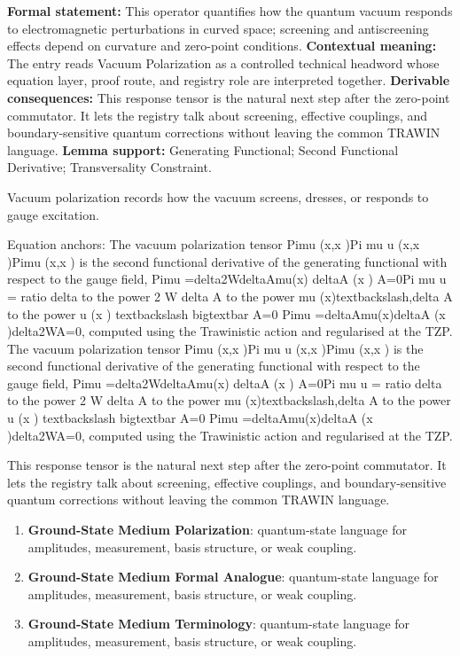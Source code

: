 \begingroup\footnotesize\setlength{\emergencystretch}{3em}\sloppy
\textbf{Formal statement:} This operator quantifies how the quantum vacuum responds to electromagnetic perturbations in curved space; screening and antiscreening effects depend on curvature and zero-point conditions. \textbf{Contextual meaning:} The entry reads Vacuum Polarization as a controlled technical headword whose equation layer, proof route, and registry role are interpreted together. \textbf{Derivable consequences:} This response tensor is the natural next step after the zero-point commutator. It lets the registry talk about screening, effective couplings, and boundary-sensitive quantum corrections without leaving the common TRAWIN language. \textbf{Lemma support:} Generating Functional; Second Functional Derivative; Transversality Constraint.\par
\endgroup

Vacuum polarization records how the vacuum screens, dresses, or responds to gauge excitation.

Equation anchors: The vacuum polarization tensor Pimu (x,x )Pi mu u (x,x )Pimu (x,x ) is the second functional derivative of the generating functional with respect to the gauge field, Pimu =delta2WdeltaAmu(x) deltaA (x ) A=0Pi mu u = ratio delta to the power 2 W delta A to the power mu (x)textbackslash,delta A to the power u (x ) textbackslash bigtextbar A=0 Pimu =deltaAmu(x)deltaA (x )delta2WA=0, computed using the Trawinistic action and regularised at the TZP. The vacuum polarization tensor Pimu (x,x )Pi mu u (x,x )Pimu (x,x ) is the second functional derivative of the generating functional with respect to the gauge field, Pimu =delta2WdeltaAmu(x) deltaA (x ) A=0Pi mu u = ratio delta to the power 2 W delta A to the power mu (x)textbackslash,delta A to the power u (x ) textbackslash bigtextbar A=0 Pimu =deltaAmu(x)deltaA (x )delta2WA=0, computed using the Trawinistic action and regularised at the TZP.

This response tensor is the natural next step after the zero-point commutator. It lets the registry talk about screening, effective couplings, and boundary-sensitive quantum corrections without leaving the common TRAWIN language.
\endgroup

\begingroup\footnotesize\sloppy
\begin{enumerate}[leftmargin=1.35em,itemsep=1pt,topsep=1pt,parsep=0pt]
\item \textbf{Ground-State Medium Polarization}: quantum-state language for amplitudes, measurement, basis structure, or weak coupling.
\item \textbf{Ground-State Medium Formal Analogue}: quantum-state language for amplitudes, measurement, basis structure, or weak coupling.
\item \textbf{Ground-State Medium Terminology}: quantum-state language for amplitudes, measurement, basis structure, or weak coupling.
\end{enumerate}
\endgroup

